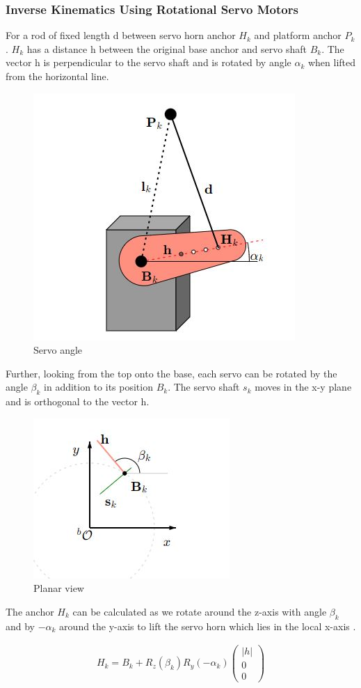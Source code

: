 \subsubsection{Inverse Kinematics Using Rotational Servo Motors}
For a rod of fixed length d between servo horn anchor $H_{k}$ and platform anchor $P_{k}$.  $H_{k}$ has a distance h between the original base anchor and servo shaft $B_{k}$. The vector h is perpendicular to the servo shaft and is rotated by angle $\alpha_{k}$ when lifted from the horizontal line.
\begin{center}
	\begin{figure}[!h]
		\centering
		\includegraphics[width=0.4\linewidth]{Figures/servo}
		\caption[Servo angle]{Servo angle \cite{Eisele_2019}}
	\end{figure}
\end{center}
Further, looking from the top onto the base, each servo can be rotated by the angle $\beta_{k}$ in addition to its position $B_{k}$. The servo shaft $s_{k}$ moves in the x-y plane and is orthogonal to the vector h.
\begin{center}
	\begin{figure}[!h]
		\centering
		\includegraphics[width=0.4\linewidth]{Figures/servo1}
		\caption[Planar view]{Planar view \cite{Eisele_2019}}
	\end{figure}
\end{center}
The anchor $H_{k}$ can be calculated as we rotate around the z-axis with angle $\beta_{k}$ and  by $-\alpha_{k}$ around the y-axis to lift the servo horn which lies in the local x-axis \cite{Eisele_2019}.
\begin{ceqn}
	\begin{align}
		H_{k} = B_{k} + R_{z}(\beta_{k}) R_{y}(-\alpha_{k})\begin{pmatrix}
			                                                   |h| \\ 0 \\ 0
		                                                   \end{pmatrix}
		\label{eq:myeqn2}
	\end{align}
\end{ceqn}
